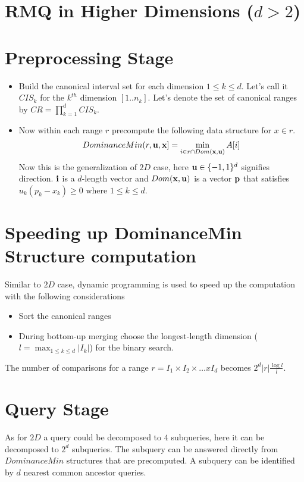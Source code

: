 \section{RMQ in Higher Dimensions ($d > 2$)}

\section{Preprocessing Stage}
\compress
\begin{itemize} \itemsep1pt \parskip0pt 
\item Build the canonical interval set for each dimension $1 \leq k \leq d$. Let's call it $CIS_k$ for the $k^{th}$ dimension $[1..n_k]$. Let's denote the set of canonical ranges by $CR = \prod\limits_{k=1}^d CIS_k$.
\item Now within each range $r$ precompute the following data structure for $x \in r$. \[DominanceMin(r,{\bf u},{\bf x}] = \min_{i \in r \cap Dom({\bf x}, {\bf u})} A[i] \]
Now this is the generalization of $2D$ case, here ${\bf u} \in \{-1,1\}^d$ signifies direction. ${\bf i}$ is a $d$-length vector and $Dom({\bf x}, {\bf u})$ is a vector ${\bf p}$ that satisfies $u_k(p_k-x_k) \geq 0$ where $1\leq k\leq d$.
\end{itemize}
\section{Speeding up DominanceMin Structure computation}
Similar to $2D$ case, dynamic programming is used to speed up the computation with the following considerations
\compress
\begin{itemize} \itemsep1pt \parskip0pt 
\item Sort the canonical ranges
\item During bottom-up merging choose the longest-length dimension ($l=\max_{1\leq k\leq d}\left\vert I_k\right\vert$) for the binary search.
\end{itemize}
The number of comparisons for a range $r=I_1\times I_2\times\ldots xI_d$ becomes $2^d\left\vert r\right\vert\frac{\log l}{l}$.
\section{Query Stage}
As for $2D$ a query could be decomposed to $4$ subqueries, here it can be decomposed to $2^d$ subqueries. The subquery can be answered directly from $DominanceMin$ structures that are precomputed. A subquery can be identified by $d$ nearest common ancestor queries.

